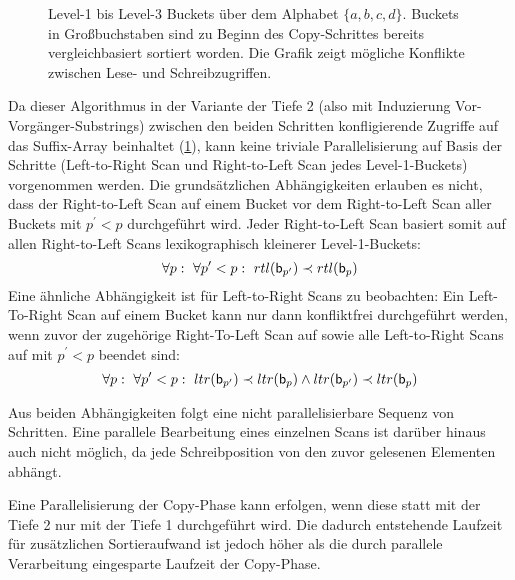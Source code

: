 {\begin{landscape}
\begin{figure}[p]
{
            }
            \caption[Parallelisierbarkeit der Copy-Technik]{Level-1 bis Level-3 Buckets über dem Alphabet \(\{a, b, c, d\}\).
            Buckets in Großbuchstaben sind zu Beginn des Copy-Schrittes bereits vergleichbasiert sortiert worden.
            Die Grafik zeigt mögliche Konflikte zwischen Lese- und Schreibzugriffen.}
            \label{fig:seward:parallel}
        \end{figure}
    \end{landscape}
}
Da dieser Algorithmus in der Variante der Tiefe 2 (also mit Induzierung Vor-Vorgänger-Substrings) zwischen den beiden Schritten konfligierende Zugriffe auf das Suffix-Array beinhaltet (\cref{fig:seward:parallel}), kann keine triviale Parallelisierung auf Basis der Schritte (Left-to-Right Scan und Right-to-Left Scan jedes Level-1-Buckets) vorgenommen werden.
Die grundsätzlichen Abhängigkeiten erlauben es nicht, dass der Right-to-Left Scan  auf einem Bucket  vor dem Right-to-Left Scan aller Buckets  mit \(p^\prime < p\) durchgeführt wird.
Jeder Right-to-Left Scan basiert somit auf allen Right-to-Left Scans lexikographisch kleinerer Level-1-Buckets:
\[\forall p:~\forall p^\prime < p:~rtl(\mathsf{b}_{p^\prime}) \prec rtl(\mathsf{b}_{p})\]
Eine ähnliche Abhängigkeit ist für Left-to-Right Scans zu beobachten: Ein Left-To-Right Scan  auf einem Bucket  kann nur dann konfliktfrei durchgeführt werden, wenn zuvor der zugehörige Right-To-Left Scan auf  sowie alle Left-to-Right Scans auf  mit \(p^\prime < p\) beendet sind:
\[\forall p:~\forall p^\prime < p:~ltr(\mathsf{b}_{p^\prime}) \prec ltr(\mathsf{b}_{p}) \wedge ltr(\mathsf{b}_{p^\prime}) \prec ltr(\mathsf{b}_{p})\]\par
Aus beiden Abhängigkeiten folgt eine nicht parallelisierbare Sequenz von Schritten. Eine parallele Bearbeitung eines einzelnen Scans ist darüber hinaus auch nicht möglich, da jede Schreibposition von den zuvor gelesenen Elementen abhängt.\par\medskip
Eine Parallelisierung der Copy-Phase kann erfolgen, wenn diese statt mit der Tiefe 2 nur mit der Tiefe 1 durchgeführt wird. Die dadurch entstehende Laufzeit für zusätzlichen Sortieraufwand ist jedoch höher als die durch parallele Verarbeitung eingesparte Laufzeit der Copy-Phase.
